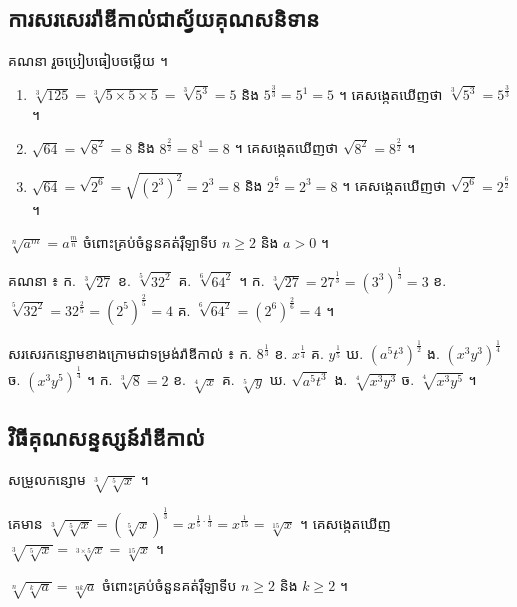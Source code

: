 \subsection{ការសរសេររ៉ាឌីកាល់ជាស្វ័យគុណសនិទាន}
\begin{example}[ឧទាហរណ៍]
គណនា រួចប្រៀបធៀបចម្លើយ ។
\end{example}
\begin{enumerate}[a]
  \item $\sqrt[3]{125} = \sqrt[3]{5\times 5\times 5} = \sqrt[3]{5^3} = 5$ និង $5^{\frac{3}{3}} = 5^1 = 5$ ។ គេសង្កេតឃើញថា $\sqrt[3]{5^3} = 5^{\frac{3}{3}}$ ។
  \item $\sqrt{64} = \sqrt{8^2} = 8$ និង $8^{\frac{2}{2}} = 8^1 = 8$ ។ គេសង្កេតឃើញថា $\sqrt{8^2} = 8^{\frac{2}{2}}$ ។
  \item $\sqrt{64} = \sqrt{2^6} = \sqrt{(2^3)^2} = 2^3 = 8$ និង $2^{\frac{6}{2}} = 2^3 = 8$ ។ គេសង្កេតឃើញថា $\sqrt{2^6} = 2^{\frac{6}{2}}$ ។
\end{enumerate}
\begin{formulaBox}[ជាទូទៅ]
$\sqrt[n]{a^m} = a^{\frac{m}{n}}$ ចំពោះគ្រប់ចំនួនគត់រ៉ឺឡាទីប $n \ge 2$ និង $a > 0$ ។
\end{formulaBox}
\begin{example}[លំហាត់គំរូ]
គណនា ៖ \quad ក. $\sqrt[3]{27}$ \quad ខ. $\sqrt[5]{32^2}$ \quad គ. $\sqrt[6]{64^2}$ ។
\ans
ក. $\sqrt[3]{27} = 27^{\frac{1}{3}} = (3^3)^{\frac{1}{3}} = 3$ \quad ខ. $\sqrt[5]{32^2} = 32^{\frac{2}{5}} = (2^5)^{\frac{2}{5}} = 4$ \quad គ. $\sqrt[6]{64^2} = (2^6)^{\frac{2}{6}} = 4$ ។
\end{example}
\begin{pro}
សរសេរកន្សោមខាងក្រោមជាទម្រង់រ៉ាឌីកាល់ ៖ \quad ក. $8^{\frac{1}{3}}$ \quad ខ. $x^{\frac{1}{4}}$ \quad គ. $y^{\frac{1}{5}}$ \quad ឃ. $(a^5t^3)^{\frac{1}{2}}$ \quad ង. $(x^3y^3)^{\frac{1}{4}}$ \quad ច. $(x^3y^5)^{\frac{1}{4}}$ ។
\ans
ក. $\sqrt[3]{8} = 2$ \quad ខ. $\sqrt[4]{x}$ \quad គ. $\sqrt[5]{y}$ \quad ឃ. $\sqrt{a^5t^3}$ \quad ង. $\sqrt[4]{x^3y^3}$ \quad ច. $\sqrt[4]{x^3y^5}$ ។
\end{pro}

\subsection{វិធីគុណសន្ទស្សន៍រ៉ាឌីកាល់}
\begin{example}[ឧទាហរណ៍]
សម្រួលកន្សោម $\sqrt[3]{\sqrt[5]{x}}$ ។
\end{example}
គេមាន $\sqrt[3]{\sqrt[5]{x}} = \left(\sqrt[5]{x}\right)^{\frac{1}{3}} = x^{\frac{1}{5}\cdot\frac{1}{3}} = x^{\frac{1}{15}} = \sqrt[15]{x}$ ។ គេសង្កេតឃើញ $\sqrt[3]{\sqrt[5]{x}} = \sqrt[3\times 5]{x} = \sqrt[15]{x}$ ។
\begin{formulaBox}[ជាទូទៅ]
$\sqrt[n]{\sqrt[k]{a}} = \sqrt[nk]{a}$ ចំពោះគ្រប់ចំនួនគត់រ៉ឺឡាទីប $n \ge 2$ និង $k \ge 2$ ។
\end{formulaBox}

